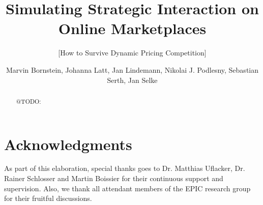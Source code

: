 \documentclass{sig-alternate-05-2015}
\begin{document}



%


\title{Simulating Strategic Interaction on Online Marketplaces}
\subtitle{[How to Survive Dynamic Pricing Competition]}



%
\author{Marvin Bornstein, Johanna Latt, Jan Lindemann, Nikolai J. Podlesny, Sebastian Serth, Jan Selke}
    

\maketitle

%
%
%
%

\begin{abstract}
@TODO:\\
\end{abstract}












\section*{Acknowledgments}
As part of this elaboration, special thanks goes to Dr. Matthias Uflacker, Dr. Rainer Schlosser and Martin Boissier for their continuous support and supervision. Also, we thank all attendant members of the EPIC research group for their fruitful discussions.



  
\end{document}
